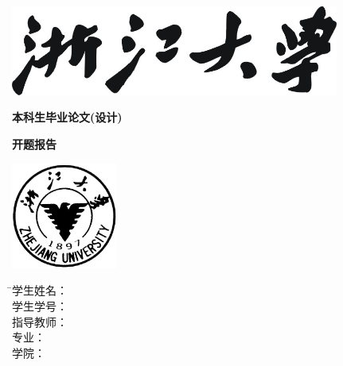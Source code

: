 
\thispagestyle{empty}

\vspace{5mm}

\begin{center}
   \includegraphics[width=108mm]{images/zjdx}
\end{center}

\centerline{\songti\xiaoyi\textbf{本科生毕业论文(设计)}}
\centerline{\songti\xiaoyi\textbf{开题报告}}
\vspace{4mm}

\begin{center}
  \includegraphics[width=35mm]{images/standxb}
\end{center}

\vspace{32mm}

\begin{tabbing}
               \hspace{30mm} \= \songti\sihao 学生姓名： \= \underline{\makebox[6cm]{\sihao\zjuauthornamec\hspace{3mm}\zjuauthorid}} \\[2mm]
              \> \songti\sihao 学生学号： \> \underline{\makebox[6cm]{}} \\[2mm]
              \> \songti\sihao 指导教师： \> \underline{\makebox[6cm]{\sihao\zjumentorc}} \\[2mm]
              \> \songti\sihao 专\hspace{10mm}业： \> \underline{\makebox[6cm]{\sihao\zjugrade\hspace{3mm}\zjumajor}} \\[2mm]
              \> \songti\sihao 学\hspace{10mm}院： \> \underline{\makebox[6cm]{\sihao\zjucollegec}}
\end{tabbing}


